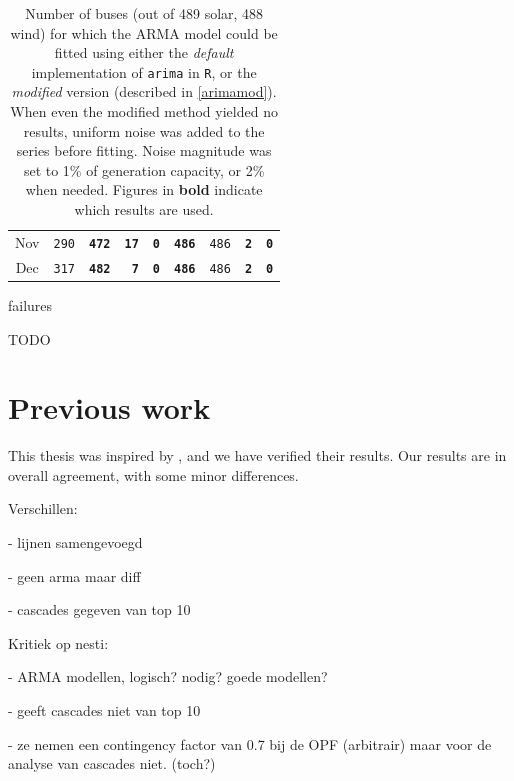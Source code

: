 \documentclass[main.tex]{subfiles}
\begin{document}
\begin{table}[]
\begin{tabular}{c|ccrr|ccrr}
Nov & \texttt{290} & \texttt{\textbf{472}} & \texttt{\textbf{17}} & \texttt{\textbf{0}} & \texttt{\textbf{486}} & \texttt{486} & \texttt{\textbf{2}} & \texttt{\textbf{0}} \\
Dec & \texttt{317} & \texttt{\textbf{482}} & \texttt{\textbf{7}} & \texttt{\textbf{0}} & \texttt{\textbf{486}} & \texttt{486} & \texttt{\textbf{2}} & \texttt{\textbf{0}} \\
\bottomrule
    \end{tabular}%
    \caption{Number of buses (out of 489 solar, 488 wind) for which the ARMA model could be fitted using either the \emph{default} implementation of \texttt{arima} in \texttt{R}, or the \emph{modified} version (described in \ref{arimamod}).
    \newline
    When even the modified method yielded no results, uniform noise was added to the series before fitting. Noise magnitude was set to 1\% of generation capacity, or 2\% when needed.
    \newline
    Figures in \textbf{bold} indicate which results are used.
    }
    \label{tab:arimafitstats}
\end{table}
failures
\begin{table}

\caption{TODO}
\label{tab:top20}
\end{table}

\section{Previous work}
This thesis was inspired by \cite{Nesti2018emergentfailures}, and we have verified their results. Our results are in overall agreement, with some minor differences. 

Verschillen:

- lijnen samengevoegd

- geen arma maar diff

- cascades gegeven van top 10


Kritiek op nesti:

- ARMA modellen, logisch? nodig? goede modellen?

- geeft cascades niet van top 10

- ze nemen een contingency factor van 0.7 bij de OPF (arbitrair) maar voor de analyse van cascades niet. (toch?)




\clearpage
\end{document}
